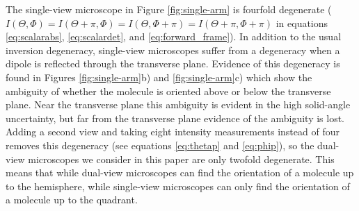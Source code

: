 \documentclass[10pt]{article}
\begin{document}
The single-view microscope in Figure \ref{fig:single-arm} is fourfold degenerate
($I(\Theta, \Phi) = I(\Theta + \pi, \Phi) = I(\Theta, \Phi + \pi) = I(\Theta +
\pi, \Phi+\pi)$ in equations \ref{eq:scalarabs}, \ref{eq:scalardet}, and
\ref{eq:forward_frame}). In addition to the usual inversion degeneracy,
single-view microscopes suffer from a degeneracy when a dipole is reflected
through the transverse plane. Evidence of this degeneracy is found in Figures
\ref{fig:single-arm}b) and \ref{fig:single-arm}c) which show the ambiguity of
whether the molecule is oriented above or below the transverse plane. Near the
transverse plane this ambiguity is evident in the high solid-angle uncertainty,
but far from the transverse plane evidence of the ambiguity is lost. Adding a
second view and taking eight intensity measurements instead of four removes this
degeneracy (see equations \ref{eq:thetap} and \ref{eq:phip}), so the dual-view
microscopes we consider in this paper are only twofold degenerate. This means
that while dual-view microscopes can find the orientation of a molecule up to
the hemisphere, while single-view microscopes can only find the orientation of a
molecule up to the quadrant.
\end{document}
